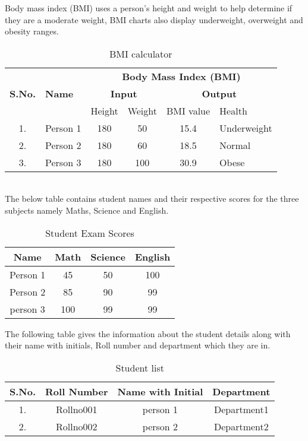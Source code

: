 \documentclass[a4paper]{article}
\begin{document}
 
	\noindent Body mass index (BMI) uses a person's height and weight to help determine if  they are a moderate weight, BMI charts also display underweight, overweight and obesity ranges.\\ 
	\begin{table}[h!] 
		\begin{center} 
			\begin{tabular}{clcccl} 
				\toprule[3.0pt] 
				\multirow{3}{*}{\bfseries S.No.}&\multirow{3}{}{\bfseries Name}& 
				\multicolumn{4}{c}{\bfseries{Body Mass Index (BMI)}} \\ 
				\cmidrule[1.0pt](lr){3-6} 
				& & \multicolumn{2}{c}{\bfseries Input} &  
				\multicolumn{2}{c}{\bfseries Output}\\ 
				\cmidrule[1.0pt](lr){3-4} \cmidrule[1.0pt](lr){5-6} 
				& & Height &Weight & BMI value & Health\\ 
				\midrule[2.0pt] 
				1. & Person 1 &180 &50 &15.4 &Underweight\\ 
				2. & Person 2&180 &60 &18.5 &Normal\\ 
				3. & Person 3 &180 & 100 &30.9 & Obese\\ 
				\bottomrule[3.0pt] 
			\end{tabular} 
			\caption{BMI calculator} 
		\end{center} 
	\end{table}\\ 
	\noindent The below table contains student names and their respective scores for the three  subjects namely Maths, Science and English. 
	\begin{table}[h!]
		\centering 
		\begin{tabular}{|c|c|c|c|} 
			\hline 
			\textbf{Name}&\textbf{Math}&\textbf{Science}&\textbf{English}\\ 
			\hline 
			Person 1&45&50&100\\ 
			\hline 
			Person 2&85&90&99\\ 
			\hline 
			person 3&100&99&99\\ 
			\hline 
		\end{tabular} 
		\caption{Student Exam Scores} 
		\label{tab:scores} 
	\end{table} 
	\noindent The following table gives the information about the student details along with  their name with initials, Roll number and department which they are in. 
	\begin{table}[h!] 
		\begin{center} 
			\begin{tabular}{cccc} 
				\hline 
				S.No.& Roll Number& Name with Initial & Department\\ 
				\hline 
				1.& Rollno001&person 1&Department1\\ 
				2.& Rollno002&person 2& Department2\\ 
				\hline 
			\end{tabular} 
			\caption{Student list}\label{tab:student list} 
		\end{center}
	\end{table} 
\end{document}
